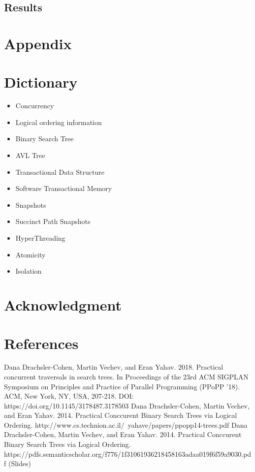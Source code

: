 \documentclass[conference]{IEEEtran}
\begin{document}
\subsection{Results}


\section{Appendix}

\section{Dictionary}
\begin{itemize}[label=$\ast$]
	\item Concurrency
	\item Logical ordering information
	\item Binary Search Tree
	\item AVL Tree
	\item Transactional Data Structure
	\item Software Transactional Memory
	\item Snapshots
	\item Succinct Path Snapshots
	\item HyperThreading
	\item Atomicity 
	\item Isolation
\end{itemize}

\section*{Acknowledgment}

\section*{References}




\begin{thebibliography}{00}
 Dana Drachsler-Cohen, Martin Vechev, and Eran Yahav. 2018. Practical concurrent traversals in search trees. In Proceedings of the 23rd ACM SIGPLAN Symposium on Principles and Practice of Parallel Programming (PPoPP '18). ACM, New York, NY, USA, 207-218. DOI: https://doi.org/10.1145/3178487.3178503
 Dana Drachsler-Cohen, Martin Vechev, and Eran Yahav. 2014. Practical Conccurent Binary Search Trees via Logical Ordering. http://www.cs.technion.ac.il/~yahave/papers/ppopp14-trees.pdf
 Dana Drachsler-Cohen, Martin Vechev, and Eran Yahav. 2014. Practical Conccurent Binary Search Trees via Logical Ordering. https://pdfs.semanticscholar.org/f776/1f31061936218458163adaa019f6f59a9030.pdf (Slides)

\end{thebibliography}
\end{document}
